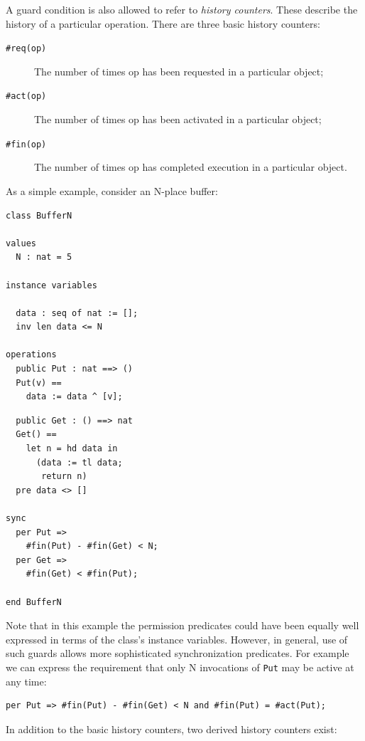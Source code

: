 \documentclass{overturerepchap}
\begin{document}
A guard condition is also allowed to refer to \emph{history counters}. These
describe the history of a particular operation. There are three basic
history counters:

\begin{description}
\item[\texttt{\#req(op)}] The number of times op has been requested in
a particular object;
\item[\texttt{\#act(op)}] The number of times op has been activated in
a particular object;
\item[\texttt{\#fin(op)}] The number of times op has completed
execution in a particular object.
\end{description}

As a simple example, consider an N-place buffer:

\begin{multicols}{2}
\begin{lstlisting}
class BufferN

values
  N : nat = 5

instance variables

  data : seq of nat := [];
  inv len data <= N

operations
  public Put : nat ==> ()
  Put(v) ==
    data := data ^ [v];

\end{lstlisting}
\begin{lstlisting}
  public Get : () ==> nat
  Get() ==
    let n = hd data in
      (data := tl data;
       return n)
  pre data <> []

sync
  per Put =>
    #fin(Put) - #fin(Get) < N;
  per Get =>
    #fin(Get) < #fin(Put);

end BufferN
\end{lstlisting}
\end{multicols}

Note that in this example the permission predicates could have been
equally well expressed in terms of the class's instance
variables. However, in general, use of such guards allows more
sophisticated synchronization predicates. For example we can express
the requirement that only N invocations of \texttt{Put} may be active at any
time:

\begin{lstlisting}
per Put => #fin(Put) - #fin(Get) < N and #fin(Put) = #act(Put);
\end{lstlisting}

In addition to the basic history counters, two derived history counters exist:
\end{document}
